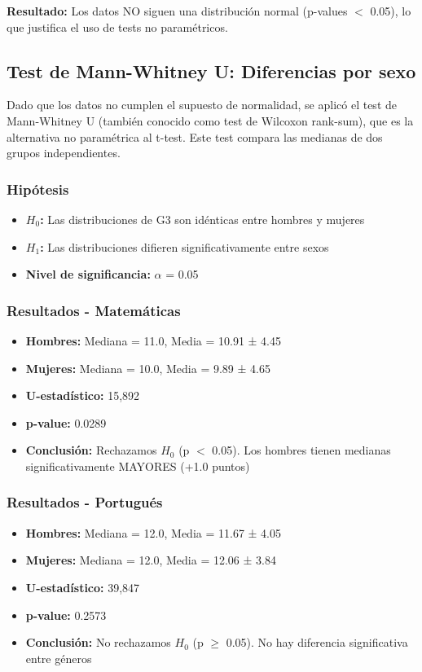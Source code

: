 \documentclass[a4paper,12pt]{article}
\begin{document}
\textbf{Resultado:} Los datos NO siguen una distribución normal (p-values $<$ 0.05), lo que justifica el uso de tests no paramétricos.

\subsection{Test de Mann-Whitney U: Diferencias por sexo}

Dado que los datos no cumplen el supuesto de normalidad, se aplicó el test de Mann-Whitney U (también conocido como test de Wilcoxon rank-sum), que es la alternativa no paramétrica al t-test. Este test compara las medianas de dos grupos independientes.

\subsubsection{Hipótesis}
\begin{itemize}
    \item \textbf{$H_0$:} Las distribuciones de G3 son idénticas entre hombres y mujeres
    \item \textbf{$H_1$:} Las distribuciones difieren significativamente entre sexos
    \item \textbf{Nivel de significancia:} $\alpha$ = 0.05
\end{itemize}

\subsubsection{Resultados - Matemáticas}
\begin{itemize}
    \item \textbf{Hombres:} Mediana = 11.0, Media = 10.91 ± 4.45
    \item \textbf{Mujeres:} Mediana = 10.0, Media = 9.89 ± 4.65
    \item \textbf{U-estadístico:} 15,892
    \item \textbf{p-value:} 0.0289
    \item \textbf{Conclusión:} Rechazamos $H_0$ (p $<$ 0.05). Los hombres tienen medianas significativamente MAYORES (+1.0 puntos)
\end{itemize}

\subsubsection{Resultados - Portugués}
\begin{itemize}
    \item \textbf{Hombres:} Mediana = 12.0, Media = 11.67 ± 4.05
    \item \textbf{Mujeres:} Mediana = 12.0, Media = 12.06 ± 3.84
    \item \textbf{U-estadístico:} 39,847
    \item \textbf{p-value:} 0.2573
    \item \textbf{Conclusión:} No rechazamos $H_0$ (p $\geq$ 0.05). No hay diferencia significativa entre géneros
\end{itemize}
\end{document}
